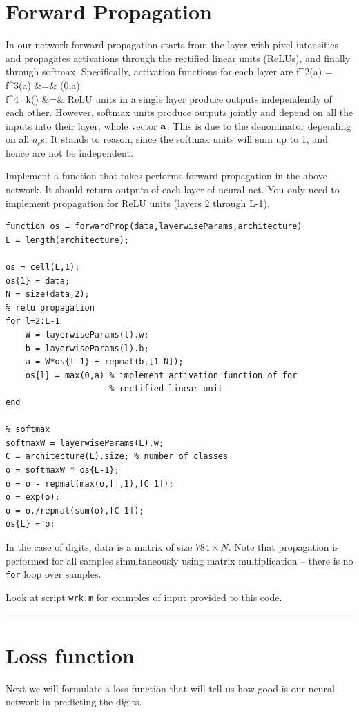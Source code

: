 \documentclass{article}
\begin{document}
\section{Forward Propagation}
In our network forward propagation starts from the layer with pixel intensities and propagates activations
through the rectified linear units (ReLUs), and finally through softmax.
Specifically, activation functions for each layer are
\BEAS
f^2(a) = f^3(a) &=& \max(0,a) \\
f^4_k(\aaa) &=& 
\EEAS
ReLU units in a single layer produce outputs independently of each other.
However, softmax units produce outputs jointly and depend on all the inputs into their layer, whole vector $\mathbf{a}$. This is due to the denominator depending on all $a_c$s.
It stands to reason, since the softmax units will sum up to 1, and hence are not be independent.

\newproblem{1pt}
Implement a function that takes performs forward propagation in the above network.
It should return outputs of each layer of neural net. You only need to implement propagation for ReLU units (layers 2 through L-1).


\begin{verbatim}
function os = forwardProp(data,layerwiseParams,architecture)
L = length(architecture);

os = cell(L,1);
os{1} = data;
N = size(data,2);
% relu propagation
for l=2:L-1
    W = layerwiseParams(l).w;
    b = layerwiseParams(l).b;
    a = W*os{l-1} + repmat(b,[1 N]);
    os{l} = max(0,a) % implement activation function of for
                     % rectified linear unit
end

% softmax
softmaxW = layerwiseParams(L).w;
C = architecture(L).size; % number of classes
o = softmaxW * os{L-1};
o = o - repmat(max(o,[],1),[C 1]);
o = exp(o);
o = o./repmat(sum(o),[C 1]);
os{L} = o;
\end{verbatim}

In the case of digits, data is a matrix of size $784 \times N$.
Note that propagation is performed for all samples simultaneously using matrix multiplication -- there is no {\texttt{for}} loop over samples.

Look at script \texttt{wrk.m} for examples of input provided to this code.

\hrule

\section{Loss function}
Next we will formulate a loss function that will tell us how good is our neural
network in predicting the digits.
\end{document}
